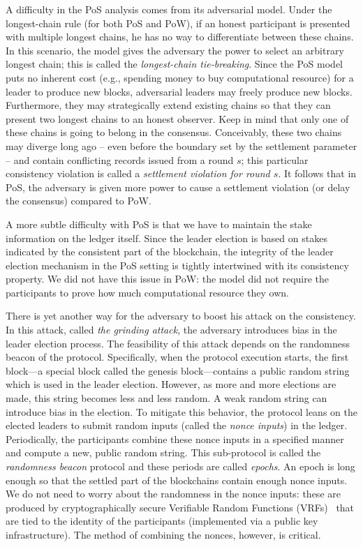 A difficulty in the PoS analysis 
comes from its adversarial model. 
Under the longest-chain rule (for both PoS and PoW), 
if an honest participant 
is presented with multiple longest chains, 
he has no way to differentiate between these chains. 
In this scenario, the model gives the adversary the power to 
select an arbitrary longest chain; 
this is called the \emph{longest-chain tie-breaking}. 
Since the PoS model puts no inherent cost 
(e.g., spending money to buy computational resource) 
for a leader to produce new blocks, 
adversarial leaders may 
freely produce new blocks. 
Furthermore, they may strategically 
extend existing chains 
so that they can 
present two longest chains to an honest observer. 
Keep in mind that only one of these chains 
is going to belong in the consensus. 
Conceivably, these two chains may diverge 
long ago -- even before the boundary set by the settlement parameter -- and 
contain conflicting records issued from a round $s$; 
this particular consistency violation is called a \emph{settlement violation for round $s$}.  
It follows that in PoS, 
the adversary is given more power to 
cause a settlement violation (or delay the consensus) 
compared to PoW. 


A more subtle difficulty with PoS is that 
we have to maintain the stake information on the ledger itself. 
Since the leader election is based on stakes indicated by the 
consistent part of the blockchain, 
the integrity of the leader election mechanism in the PoS setting 
is tightly intertwined 
with its consistency property. 
We did not have this issue in PoW: 
the model did not require the participants to prove 
how much computational resource they own.

There is yet another way for the adversary to boost his attack on the consistency. 
In this attack, called \emph{the grinding attack}, 
the adversary introduces bias in the leader election process. 
The feasibility of this attack depends on the randomness beacon of the protocol. 
Specifically, when the protocol execution starts, 
the first block---a special block called the genesis block---contains 
a public random string which is used in the leader election. 
However, as more and more elections are made, 
this string becomes less and less random. 
A weak random string can introduce bias in the election. 
To mitigate this behavior, 
the protocol leans on the elected leaders to 
submit random inputs (called the \emph{nonce inputs}) in the ledger. 
Periodically, the participants combine these nonce inputs in a specified manner 
and compute a new, public random string. 
This sub-protocol is called the \emph{randomness beacon} protocol 
and these periods are called \emph{epochs}. 
An epoch is long enough so that the settled part of the blockchains contain enough nonce inputs. 
We do not need to worry about the randomness in the nonce inputs: 
these are produced by cryptographically secure Verifiable Random Functions (VRFs)~\cite{VRFMicali,VRFDodis} 
that are tied to the identity of the participants (implemented via a public key infrastructure). 
The method of combining the nonces, however, is critical. 

